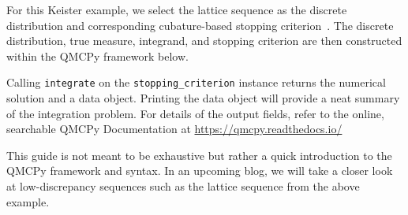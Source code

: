 For this Keister example, we select the lattice sequence as the discrete distribution and corresponding cubature-based stopping criterion~\cite{JimHic16a}. The discrete distribution, true measure, integrand, and stopping criterion are then constructed within the QMCPy framework below. 



Calling \texttt{integrate} on the \texttt{stopping\_criterion} instance returns the numerical solution and a data object. Printing the data object will provide a neat summary of the integration problem. For details of the output fields, refer to the online, searchable QMCPy Documentation at \href{https://qmcpy.readthedocs.io/en/latest/algorithms.html#module-qmcpy.integrand.keister}{https://qmcpy.readthedocs.io/}


This guide is not meant to be exhaustive but rather a quick introduction to the QMCPy framework and syntax. In an upcoming blog, we will take a closer look at low-discrepancy sequences such as the lattice sequence from the above example.  
